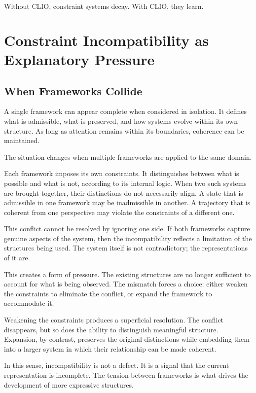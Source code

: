 \documentclass[11pt,openany]{book}
\begin{document}
Without CLIO, constraint systems decay.
With CLIO, they learn.


\chapter{Constraint Incompatibility as Explanatory Pressure}
\label{ch:incompatibility}

\section*{ When Frameworks Collide}

A single framework can appear complete when considered in isolation. It defines what is admissible, what is preserved, and how systems evolve within its own structure. As long as attention remains within its boundaries, coherence can be maintained.

The situation changes when multiple frameworks are applied to the same domain.

Each framework imposes its own constraints. It distinguishes between what is possible and what is not, according to its internal logic. When two such systems are brought together, their distinctions do not necessarily align. A state that is admissible in one framework may be inadmissible in another. A trajectory that is coherent from one perspective may violate the constraints of a different one.

This conflict cannot be resolved by ignoring one side. If both frameworks capture genuine aspects of the system, then the incompatibility reflects a limitation of the structures being used. The system itself is not contradictory; the representations of it are.

This creates a form of pressure. The existing structures are no longer sufficient to account for what is being observed. The mismatch forces a choice: either weaken the constraints to eliminate the conflict, or expand the framework to accommodate it.

Weakening the constraints produces a superficial resolution. The conflict disappears, but so does the ability to distinguish meaningful structure. Expansion, by contrast, preserves the original distinctions while embedding them into a larger system in which their relationship can be made coherent.

In this sense, incompatibility is not a defect. It is a signal that the current representation is incomplete. The tension between frameworks is what drives the development of more expressive structures.
\end{document}
